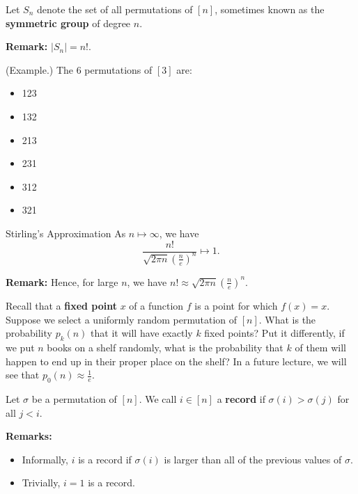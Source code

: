 \begin{definition}{}{}
    Let $S_n$ denote the set of all permutations of $[n]$, sometimes known as the \textbf{symmetric group} of degree $n$.
\end{definition}
\textbf{Remark:} $|S_n| = n!$.

\begin{mdframed}[]
    (Example.) The 6 permutations of $[3]$ are: 
    \begin{itemize}
        \item 123
        \item 132
        \item 213
        \item 231
        \item 312
        \item 321
    \end{itemize}
\end{mdframed}

\begin{theorem}{Stirling's Approximation}{}
    As $n \mapsto \infty$, we have 
    \[\frac{n!}{\sqrt{2\pi n} \left(\frac{n}{e}\right)^n} \mapsto 1.\]
\end{theorem}
\textbf{Remark:} Hence, for large $n$, we have $n! \approx \sqrt{2\pi n} \left(\frac{n}{e}\right)^n$. 

\bigskip 

Recall that a \textbf{fixed point} $x$ of a function $f$ is a point for which $f(x) = x$. Suppose we select a uniformly random permutation of $[n]$. What is the probability $p_{k}(n)$ that it will have exactly $k$ fixed points? Put it differently, if we put $n$ books on a shelf randomly, what is the probability that $k$ of them will happen to end up in their proper place on the shelf? In a future lecture, we will see that $p_{0}(n) \approx \frac{1}{e}$. 

\bigskip 

\begin{definition}{}{}
    Let $\sigma$ be a permutation of $[n]$. We call $i \in [n]$ a \textbf{record} if $\sigma(i) > \sigma(j)$ for all $j < i$. 
\end{definition}
\textbf{Remarks:}
\begin{itemize}
    \item Informally, $i$ is a record if $\sigma(i)$ is larger than all of the previous values of $\sigma$. 
    \item Trivially, $i = 1$ is a record.
\end{itemize}

